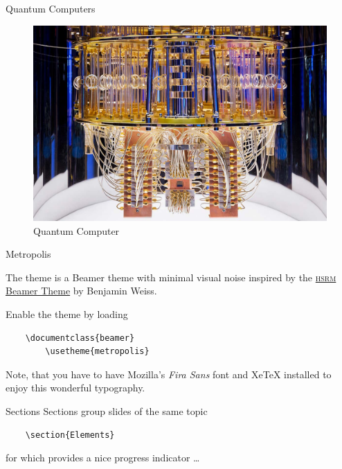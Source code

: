 \begin{frame}[fragile]{Quantum Computers}
\begin{figure}[H]
  \centering
    \includegraphics[width=.8\linewidth]{assets/quantum-computers-1.jpg}
    \caption{Quantum Computer}
\end{figure}

\end{frame}

\begin{frame}[fragile]{Metropolis}
	
	The \themename theme is a Beamer theme with minimal visual noise
	inspired by the \href{https://github.com/hsrmbeamertheme/hsrmbeamertheme}{\textsc{hsrm} Beamer
		Theme} by Benjamin Weiss.
	
	Enable the theme by loading
	
	\begin{verbatim}    \documentclass{beamer}
		\usetheme{metropolis}\end{verbatim}
	
	Note, that you have to have Mozilla's \emph{Fira Sans} font and XeTeX
	installed to enjoy this wonderful typography.
\end{frame}

\begin{frame}[fragile]{Sections}
	Sections group slides of the same topic
	
	\begin{verbatim}    \section{Elements}\end{verbatim}
	
	for which \themename provides a nice progress indicator \ldots
	
\end{frame}